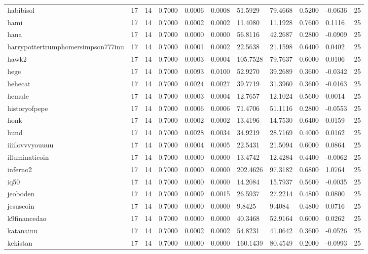 \begin{table}[htbp]
\begin{tabular}{lllllllllll}
habibisol & 17 & 14 & 0.7000 & 0.0006 & 0.0008 & 51.5929 & 79.4668 & 0.5200 & -0.0636 & 25 \\
hami & 17 & 14 & 0.7000 & 0.0002 & 0.0002 & 11.4080 & 11.1928 & 0.7600 & 0.1116 & 25 \\
hana & 17 & 14 & 0.7000 & 0.0000 & 0.0000 & 56.8116 & 42.2687 & 0.2800 & -0.0909 & 25 \\
harrypottertrumphomersimpson777inu & 17 & 14 & 0.7000 & 0.0001 & 0.0002 & 22.5638 & 21.1598 & 0.6400 & 0.0402 & 25 \\
hawk2 & 17 & 14 & 0.7000 & 0.0003 & 0.0004 & 105.7528 & 79.7637 & 0.6000 & 0.0106 & 25 \\
hege & 17 & 14 & 0.7000 & 0.0093 & 0.0100 & 52.9270 & 39.2689 & 0.3600 & -0.0342 & 25 \\
hehecat & 17 & 14 & 0.7000 & 0.0024 & 0.0027 & 39.7719 & 31.3960 & 0.3600 & -0.0163 & 25 \\
hemule & 17 & 14 & 0.7000 & 0.0003 & 0.0004 & 12.7657 & 12.1024 & 0.5600 & 0.0014 & 25 \\
historyofpepe & 17 & 14 & 0.7000 & 0.0006 & 0.0006 & 71.4706 & 51.1116 & 0.2800 & -0.0553 & 25 \\
honk & 17 & 14 & 0.7000 & 0.0002 & 0.0002 & 13.4196 & 14.7530 & 0.6400 & 0.0159 & 25 \\
hund & 17 & 14 & 0.7000 & 0.0028 & 0.0034 & 34.9219 & 28.7169 & 0.4000 & 0.0162 & 25 \\
iiiilovvvyouuuu & 17 & 14 & 0.7000 & 0.0004 & 0.0005 & 22.5431 & 21.5094 & 0.6000 & 0.0864 & 25 \\
illuminaticoin & 17 & 14 & 0.7000 & 0.0000 & 0.0000 & 13.4742 & 12.4284 & 0.4400 & -0.0062 & 25 \\
inferno2 & 17 & 14 & 0.7000 & 0.0000 & 0.0000 & 202.4626 & 97.3182 & 0.6800 & 1.0764 & 25 \\
iq50 & 17 & 14 & 0.7000 & 0.0000 & 0.0000 & 14.2084 & 15.7937 & 0.5600 & -0.0035 & 25 \\
jeoboden & 17 & 14 & 0.7000 & 0.0009 & 0.0015 & 26.5937 & 27.2214 & 0.4800 & 0.0800 & 25 \\
jesuscoin & 17 & 14 & 0.7000 & 0.0000 & 0.0000 & 9.8425 & 9.4084 & 0.4800 & 0.0716 & 25 \\
k9financedao & 17 & 14 & 0.7000 & 0.0000 & 0.0000 & 40.3468 & 52.9164 & 0.6000 & 0.0262 & 25 \\
katanainu & 17 & 14 & 0.7000 & 0.0002 & 0.0002 & 54.8231 & 41.0642 & 0.3600 & -0.0526 & 25 \\
kekistan & 17 & 14 & 0.7000 & 0.0000 & 0.0000 & 160.1439 & 80.4549 & 0.2000 & -0.0993 & 25 \\

\end{tabular}
\end{table}
